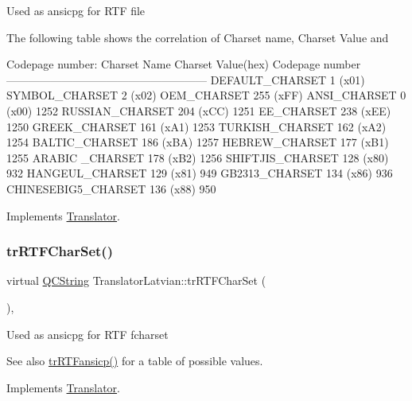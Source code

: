 Used as ansicpg for R\+TF file

The following table shows the correlation of Charset name, Charset Value and 
\begin{DoxyPre}
Codepage number:
Charset Name       Charset Value(hex)  Codepage number
------------------------------------------------------
DEFAULT\_CHARSET           1 (x01)
SYMBOL\_CHARSET            2 (x02)
OEM\_CHARSET             255 (xFF)
ANSI\_CHARSET              0 (x00)            1252
RUSSIAN\_CHARSET         204 (xCC)            1251
EE\_CHARSET              238 (xEE)            1250
GREEK\_CHARSET           161 (xA1)            1253
TURKISH\_CHARSET         162 (xA2)            1254
BALTIC\_CHARSET          186 (xBA)            1257
HEBREW\_CHARSET          177 (xB1)            1255
ARABIC \_CHARSET         178 (xB2)            1256
SHIFTJIS\_CHARSET        128 (x80)             932
HANGEUL\_CHARSET         129 (x81)             949
GB2313\_CHARSET          134 (x86)             936
CHINESEBIG5\_CHARSET     136 (x88)             950
\end{DoxyPre}
 

Implements \mbox{\hyperlink{class_translator_a9953a4c0e6a4fc7d017abcd5c2939e0f}{Translator}}.

\mbox{\label{class_translator_latvian_a75d9c10a0e6401330ddd1a36471cff91}} 
\subsubsection{\texorpdfstring{trRTFCharSet()}{trRTFCharSet()}}
{\footnotesize\ttfamily virtual \mbox{\hyperlink{class_q_c_string}{Q\+C\+String}} Translator\+Latvian\+::tr\+R\+T\+F\+Char\+Set (\begin{DoxyParamCaption}{ }\end{DoxyParamCaption})\hspace{0.3cm}{\ttfamily [inline]}, {\ttfamily [virtual]}}

Used as ansicpg for R\+TF fcharset \begin{DoxySeeAlso}{See also}
\mbox{\hyperlink{class_translator_latvian_a69eda1383838391ddc6633bb881d0df4}{tr\+R\+T\+Fansicp()}} for a table of possible values. 
\end{DoxySeeAlso}


Implements \mbox{\hyperlink{class_translator_afad391f3cbfb5ce6332b7239f8e2049a}{Translator}}.

